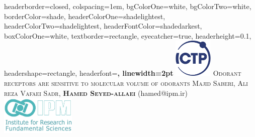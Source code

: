 \documentclass[a1paper,fontscale=0.5]{baposter} %
\begin{document}
\begin{poster}
{
headerborder=closed, %
colspacing=1em, %
bgColorOne=white, %
bgColorTwo=white, %
borderColor=shade, %
headerColorOne=shadelightest, %
headerColorTwo=shadelightest, %
headerFontColor=shadedarkest, %
boxColorOne=white, %
textborder=rectangle, %
eyecatcher=true, %
headerheight=0.1\textheight, %
headershape=rectangle, %
headerfont=\Large\bf\textsc, %
linewidth=2pt %
}
%
{\includegraphics[height=5em]{fig/ICTP_logo}} %
{\huge \textsc{Odorant receptors are sensitive to molecular volume of odorants}} %
{\textsc{ Majid Saberi, Ali reza Vafaei Sadr, \bf{Hamed Seyed-allaei} \vspace{0.5em} }(hamed@ipm.ir)}
{\includegraphics[height=5em]{fig/logo.jpg}} %



\end{poster}
\end{document}
